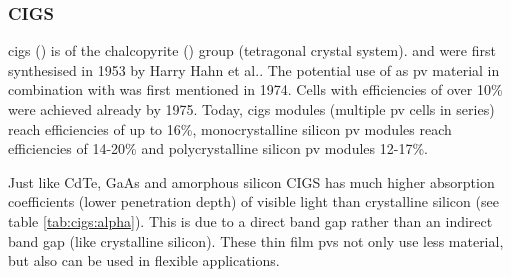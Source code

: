 \subsubsection{CIGS}
\gls{cigs} () is of the chalcopyrite () group (tetragonal crystal system). 
 and  were first synthesised in 1953 by Harry Hahn et al.\cite{hahn1953untersuchungen}.
The potential use of  as \gls{pv} material in combination with  was first mentioned in 1974\cite{wagner1974cuinse2}.
Cells with efficiencies of over 10\% were achieved already by 1975.\cite{kazmerski1976thin}
Today, 
\gls{cigs} modules (multiple \gls{pv} cells in series) 
reach efficiencies of up to 16\%\cite{feurer2017cigs},
monocrystalline silicon \gls{pv} modules reach efficiencies of 14-20\%
and polycrystalline silicon \gls{pv} modules 12-17\%\cite{mcevoy2011practical}.

Just like CdTe, GaAs and amorphous silicon CIGS has much higher absorption coefficients 
(lower penetration depth) of visible light than crystalline silicon (see table \ref{tab:cigs:alpha}). 
This is due to a direct band gap rather than an indirect band gap (like crystalline silicon). 
These thin film \gls{pv}s not only use less material, but also can be used in flexible applications. 

